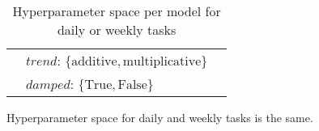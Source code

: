 \begin{center}
\begin{table}[h!]
{\begin{tabular}{|l|l|l|}
                                  & $trend$: $\{\text{additive}, \text{multiplicative}\}$ & \\
                                  & $damped$: $\{\text{True}, \text{False}\}$ & \\
            \hline
        \end{tabular}}
        \caption{ Hyperparameter space per model for daily or weekly tasks}
        {\raggedright \footnotesize Hyperparameter space for daily and weekly tasks is the same.\par}
        \label{tbl: hyper space daily/weekly}
    \end{table}
\end{center}
